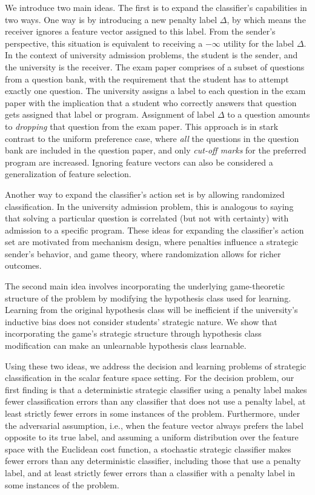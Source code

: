 We introduce two main ideas. The first is to expand the classifier's capabilities in two ways. One way is by introducing a new penalty label $\Delta$, by which means the receiver ignores a feature vector assigned to this label. From the sender's perspective, this situation is equivalent to receiving a $-\infty$ utility for the label $\Delta$. In the context of university admission problems, the student is the sender, and the university is the receiver. The exam paper comprises of a subset of questions from a question bank, with the requirement that the student has to attempt exactly one question. The university assigns a label to each question in the exam paper with the implication that a student who correctly answers that question gets assigned that label or program. Assignment of label $\Delta$ to a question amounts to \textit{dropping} that question from the exam paper. This approach is in stark contrast to the uniform preference case, where \textit{all} the questions in the question bank are included in the question paper, and only \textit{cut-off marks} for the preferred program are increased.
Ignoring feature vectors can also be considered a generalization of feature selection.

Another way to expand the classifier's action set is by allowing randomized classification. In the university admission problem, this is analogous to saying that solving a particular question is correlated (but not with certainty) with admission to a specific program. These ideas for expanding the classifier's action set are motivated from mechanism design, where penalties influence a strategic sender's behavior, and game theory, where randomization allows for richer outcomes.

The second main idea involves incorporating the underlying game-theoretic structure of the problem by modifying the hypothesis class used for learning. Learning from the original hypothesis class will be inefficient if the university's inductive bias does not consider students' strategic nature. We show that incorporating the game's strategic structure through hypothesis class modification can make an unlearnable hypothesis class learnable.

Using these two ideas, we address the decision and learning problems of strategic classification in the scalar feature space setting. For the decision problem, our first finding is that a deterministic strategic classifier using a penalty label makes fewer classification errors than any classifier that does not use a penalty label, at least strictly fewer errors in some instances of the problem. 
Furthermore, under the adversarial assumption, i.e., when the feature vector always prefers the label opposite to its true label, and assuming a uniform distribution over the feature space with the Euclidean cost function, a stochastic strategic classifier makes fewer errors than any deterministic classifier, including those that use a penalty label, and at least strictly fewer errors than a classifier with a penalty label in some instances of the problem.

